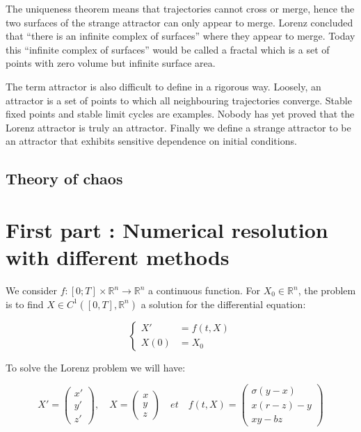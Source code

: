 \documentclass[12pt]{article}
\begin{document}
	\noindent The uniqueness theorem means that trajectories cannot cross or merge, hence the two surfaces of the strange attractor can only appear to merge. Lorenz concluded that “there is an infinite
	complex of surfaces” where they appear to merge. Today this “infinite complex of surfaces” would be called a fractal which is a set of points with zero volume but infinite surface area.
	
	\noindent The term attractor is also difficult to define in a rigorous way. Loosely, an attractor is a set of points to which all neighbouring trajectories converge. Stable fixed points and
	stable limit cycles are examples. Nobody has yet proved that the Lorenz attractor is truly an attractor. Finally we define a strange attractor to be an attractor that exhibits sensitive dependence
	on initial conditions.
	
	\subsection{Theory of chaos}
	
	\section{First part : Numerical resolution with different methods}
		
	We consider $f : [0; T] \times \mathbb{R}^n \rightarrow \mathbb{R}^n$ a continuous function. For $X_0\in \mathbb{R}^n$, the problem is to find  $X\in C^1([0,T],\mathbb{R}^n)$ a solution for the differential equation:
	
	$$\left\{\begin{aligned}
		X'&=f(t,X) \\
		X(0)&=X_0
	\end{aligned}\right.$$
	
	\noindent To solve the Lorenz problem we will have:
	
	$$X'=\begin{pmatrix}
		x' \\
		y' \\
		z'
	\end{pmatrix}, \quad X=\begin{pmatrix}
		x \\
		y \\
		z
	\end{pmatrix} \quad et \quad f(t,X)=\begin{pmatrix}
		\sigma(y-x) \\
		x(r-z)-y \\
		xy-bz
	\end{pmatrix}$$
\end{document}
